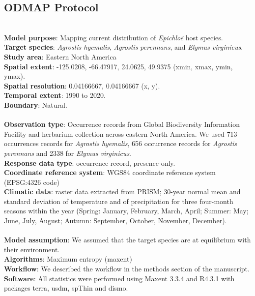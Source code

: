 \documentclass[11pt]{article}
\begin{document}
	\subsection*{ODMAP Protocol}\label{sec:sdm}
{\color{blue}{Overview}}\\
\textbf {Model  purpose}: Mapping current distribution of \emph{Epichloë} host species. \\
\textbf {Target species}: \emph{Agrostis hyemalis}, \emph{Agrostis perennans}, and \emph{Elymus virginicus}. \\
\textbf {Study area}: Eastern North America \\
\textbf {Spatial extent}: -125.0208, -66.47917, 24.0625, 49.9375 (xmin, xmax, ymin, ymax).\\
\textbf {Spatial resolution}: 0.04166667, 0.04166667 (x, y).\\
\textbf {Temporal extent}: 1990 to 2020.\\
\textbf {Boundary}: Natural.\\
{\color{blue}{Data}}\\
\textbf {Observation type}: Occurrence records from  Global Biodiversity Information Facility and herbarium collection across eastern North America. We used 713 occurrences records for \emph{Agrostis hyemalis}, 656 occurrence records for \emph{Agrostis perennans} and 2338 for \emph{Elymus virginicus}.\\
\textbf{Response data type}: occurrence record, presence-only.\\
\textbf{Coordinate reference system}: WGS84 coordinate reference system (EPSG:4326 code)\\
\textbf{Climatic data}:  raster data extracted from PRISM;  30-year normal mean and standard deviation of temperature and of precipitation for three four-month seasons within the year (Spring: January, February, March, April; Summer: May; June, July, August; Autumn: September, October, November, December).  \\
{\color{blue}{Model }}\\
\textbf{Model assumption}: We assumed that the target species are at equilibrium with their environment. \\
\textbf{Algorithms}: Maximum entropy (maxent)\\
\textbf{Workflow}: We  described the workflow in the methods section of the manuscript. \\
\textbf{Software}:  All statistics were performed using Maxent 3.3.4 and R4.3.1 with packages terra, usdm, spThin and dismo.\\
\end{document}
